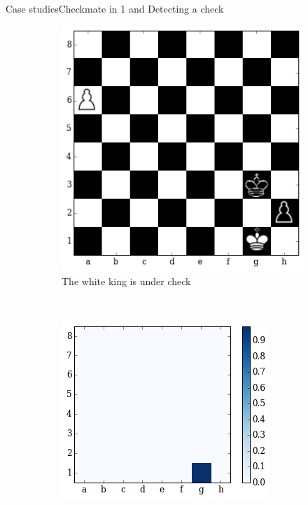 \documentclass[9pt, unknownkeysallowed]{beamer}
\begin{document}
\begin{frame}{Case studies}{Checkmate in 1 and Detecting a check}
\begin{figure}[H]
  \centering
    \begin{subfigure}[t]{0.3\textwidth}
        \centering
        \includegraphics[width=\textwidth]{../img/best_moves/output_24_0.png}
        \caption{The white king is under check}
    \end{subfigure}
    ~
    \begin{subfigure}[t]{0.3\textwidth}
        \centering
        \includegraphics[width=\textwidth]{../img/best_moves/output_24_2.png}

\end{subfigure}
\end{figure}
\end{frame}
\end{document}
